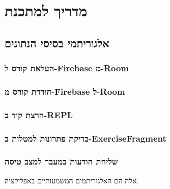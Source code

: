\chapter{מדריך למתכנת}
\section{אלגוריתמי בסיסי הנתונים}
\subsection*{העלאת קורס ל-Firebase מ-Room}


\subsection*{הורדת קורס מ-Firebase ל-Room}


\subsection*{הרצת קוד ב-REPL}


\subsection*{בדיקת פתרונות למטלות ב-ExerciseFragment}


\subsection*{שליחת הודעות במעבר למצב טיסה}


אלה הם האלגוריתמים המשמעותיים באפליקציה.